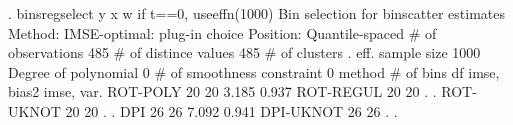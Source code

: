 . binsregselect y x w if t==0, useeffn(1000)
{\smallskip}
{\smallskip}
Bin selection for binscatter estimates
Method: IMSE-optimal: plug-in choice
Position: Quantile-spaced
{\smallskip}
          \# of observations {\VBAR}     485
       \# of distince values {\VBAR}     485
              \# of clusters {\VBAR}       .
           eff. sample size {\VBAR}    1000
       Degree of polynomial {\VBAR}       0
 \# of smoothness constraint {\VBAR}       0
{\smallskip}
    method    {\VBAR}  \# of bins {\VBAR}     df   {\VBAR} imse, bias{\caret}2 {\VBAR}  imse, var.  
   ROT-POLY   {\VBAR}      20    {\VBAR}     20   {\VBAR}    3.185     {\VBAR}    0.937
   ROT-REGUL  {\VBAR}      20    {\VBAR}     20   {\VBAR}        .     {\VBAR}        .
   ROT-UKNOT  {\VBAR}      20    {\VBAR}     20   {\VBAR}        .     {\VBAR}        .
      DPI     {\VBAR}      26    {\VBAR}     26   {\VBAR}    7.092     {\VBAR}    0.941
   DPI-UKNOT  {\VBAR}      26    {\VBAR}     26   {\VBAR}        .     {\VBAR}        .
